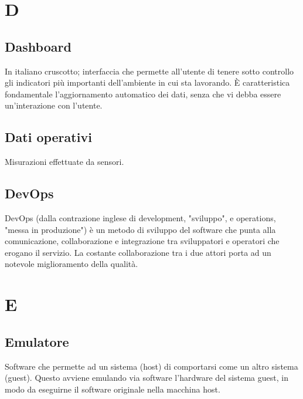 \clearpage
\section*{D}

\subsection*{Dashboard}
In italiano cruscotto; interfaccia che permette all'utente di tenere sotto controllo gli indicatori più importanti dell'ambiente in cui sta lavorando. È caratteristica fondamentale l'aggiornamento automatico dei dati, senza che vi debba essere un'interazione con l'utente.

\subsection*{Dati operativi}
Misurazioni effettuate da sensori.


\subsection*{DevOps}
DevOps (dalla contrazione inglese di development, "sviluppo", e operations, "messa in produzione") è un metodo di sviluppo del software che punta alla comunicazione, collaborazione e integrazione tra sviluppatori e operatori che erogano il servizio. La costante collaborazione tra i due attori porta ad un notevole miglioramento della qualità.

\clearpage
\section*{E}

\subsection*{Emulatore}
Software che permette ad un sistema (host) di comportarsi come un altro sistema (guest).
Questo avviene emulando via software l'hardware del sistema guest, in modo da eseguirne il software originale nella macchina host.


